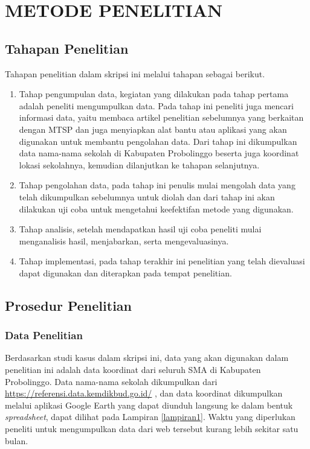 \chapter{METODE PENELITIAN}

\section{Tahapan Penelitian}

Tahapan penelitian dalam skripsi ini melalui tahapan sebagai berikut.

\begin{enumerate}
	\item Tahap pengumpulan data, kegiatan yang dilakukan pada tahap pertama adalah peneliti mengumpulkan data. Pada tahap ini peneliti juga mencari informasi data, yaitu membaca artikel penelitian sebelumnya yang berkaitan dengan MTSP dan juga menyiapkan alat bantu atau aplikasi yang akan digunakan untuk membantu pengolahan data. Dari tahap ini dikumpulkan data nama-nama sekolah di Kabupaten Probolinggo beserta juga koordinat lokasi sekolahnya, kemudian dilanjutkan ke tahapan selanjutnya.
	\item Tahap pengolahan data, pada tahap ini penulis mulai mengolah data yang telah dikumpulkan sebelumnya untuk diolah dan dari tahap ini akan dilakukan uji coba untuk mengetahui keefektifan metode yang digunakan.
	\item Tahap analisis, setelah mendapatkan hasil uji coba peneliti mulai menganalisis hasil, menjabarkan, serta mengevaluasinya.
	\item Tahap implementasi, pada tahap terakhir ini penelitian yang telah dievaluasi dapat digunakan dan diterapkan pada tempat penelitian.
\end{enumerate}

\section{Prosedur Penelitian}


\subsection{Data Penelitian}
    
Berdasarkan studi kasus dalam skripsi ini, data yang akan digunakan dalam penelitian ini adalah data koordinat dari seluruh SMA di Kabupaten Probolinggo. Data nama-nama sekolah dikumpulkan dari \url{https://referensi.data.kemdikbud.go.id/} \cite{kemendikbud}, dan data koordinat dikumpulkan melalui aplikasi Google Earth \cite{googleearth} yang dapat diunduh langsung ke dalam bentuk \textit{spreadsheet}, dapat dilihat pada Lampiran \ref{lampiran1}. Waktu yang diperlukan peneliti untuk mengumpulkan data dari web tersebut kurang lebih sekitar satu bulan.

